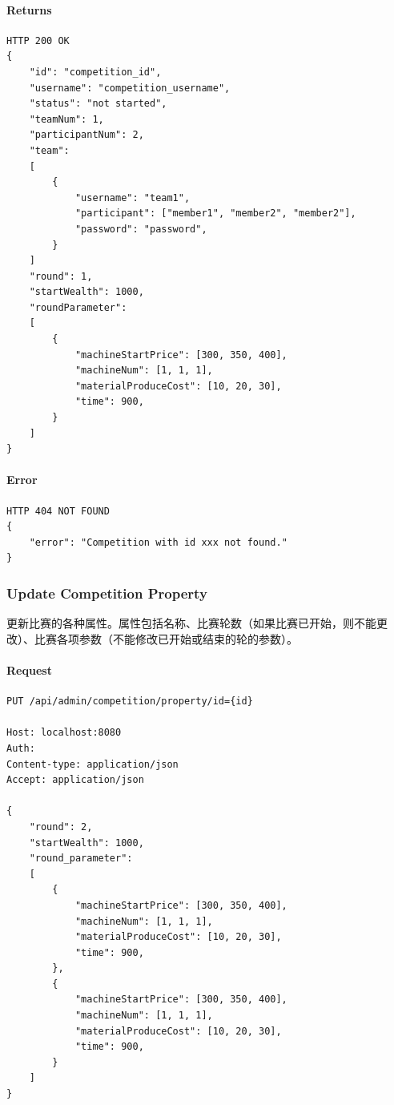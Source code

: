 \documentclass{article}
\begin{document}
\paragraph*{Returns}
\begin{lstlisting}
HTTP 200 OK
{
    "id": "competition_id",
    "username": "competition_username",
    "status": "not started",
    "teamNum": 1,
    "participantNum": 2,
    "team":
    [
        {
            "username": "team1",
            "participant": ["member1", "member2", "member2"],
            "password": "password",
        }
    ]
    "round": 1,
    "startWealth": 1000,
    "roundParameter":
    [
        {
            "machineStartPrice": [300, 350, 400],
            "machineNum": [1, 1, 1],
            "materialProduceCost": [10, 20, 30],
            "time": 900,
        }
    ]
}

\end{lstlisting}

\paragraph*{Error}
\begin{lstlisting}
HTTP 404 NOT FOUND
{
    "error": "Competition with id xxx not found."
}
\end{lstlisting}

\subsubsection{Update Competition Property}

更新比赛的各种属性。属性包括名称、比赛轮数（如果比赛已开始，则不能更改）、比赛各项参数（不能修改已开始或结束的轮的参数）。

\paragraph*{Request}
\begin{lstlisting}
PUT /api/admin/competition/property/id={id}

Host: localhost:8080
Auth:
Content-type: application/json
Accept: application/json

{
    "round": 2,
    "startWealth": 1000,
    "round_parameter":
    [
        {
            "machineStartPrice": [300, 350, 400],
            "machineNum": [1, 1, 1],
            "materialProduceCost": [10, 20, 30],
            "time": 900,
        },
        {
            "machineStartPrice": [300, 350, 400],
            "machineNum": [1, 1, 1],
            "materialProduceCost": [10, 20, 30],
            "time": 900,
        }
    ]
}
\end{lstlisting}
\end{document}
